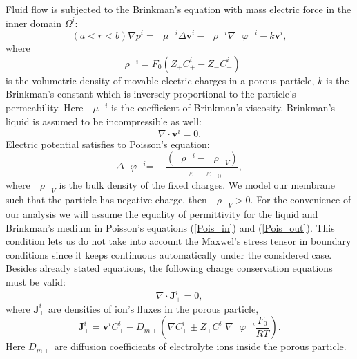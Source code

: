 \documentclass{amsart}
\begin{document}
Fluid flow is subjected to the Brinkman's equation with mass electric force in the inner domain  $\Omega^i:$
\begin{equation}\label{Brinkman}\left( a<r<b \right)
\nabla {{p}^{i}}={{\text{ }\!\!\mu\!\!\text{ }}^{i}}\Delta {{\mathbf{v}}^{i}}-{{\text{ }\!\!\rho\!\!\text{ }}^{i}}\nabla {{\text{ }\!\!\varphi\!\!\text{ }}^{i}}-k{{\mathbf{v}}^{i}},	
\end{equation}																						
where
\begin{equation}\label{rho}
{{\text{ }\!\!\rho\!\!\text{ }}^{i}}={{F}_{0}}\left( {{Z}_{+}}C_{+}^{i}-{{Z}_{-}}C_{-}^{i} \right)	
\end{equation}																								
is the volumetric  density of movable electric charges in a porous particle, $k$ is the Brinkman's constant which is inversely proportional to the particle's permeability. Here ${{\text{ }\!\!\mu\!\!\text{ }}^{i}}$ is the coefficient of  Brinkman's viscosity.  Brinkman's liquid is assumed to be incompressible as well:
\begin{equation}\label{divvi}
\nabla \cdot {{\mathbf{v}}^{i}}=0.
\end{equation}																														
Electric potential satisfies to Poisson's equation:
\begin{equation}\label{Pois_in}
\Delta {{\text{ }\!\!\varphi\!\!\text{ }}^{i}}\text{=}-\frac{\left( {{\text{ }\!\!\rho\!\!\text{ }}^{i}}-{{\text{ }\!\!\rho\!\!\text{ }}_{V}} \right)}{\text{ }\!\!\varepsilon\!\!\text{ }{{\text{ }\!\!\varepsilon\!\!\text{ }}_{0}}},						
\end{equation}																				
where ${{\text{ }\!\!\rho\!\!\text{ }}_{V}}$ is the bulk density of the fixed charges. We model our membrane such that the particle has negative charge, then ${{\text{ }\!\!\rho\!\!\text{ }}_{V}}>0$. For the convenience of our analysis we will assume the equality of permittivity for the liquid and Brinkman's medium in Poisson's equations (\ref{Pois_in}) and (\ref{Pois_out}).  This condition lets us do not take into account the Maxwel's stress tensor in boundary conditions since it keeps continuous automatically under the considered case. Besides already stated equations, the following  charge conservation equations must be valid:
\begin{equation}\label{Ji}
\nabla \cdot \mathbf{J}_{\pm }^{i}=0,
\end{equation}																														
where $\mathbf{J}_{\pm }^{i}$ are  densities of ion's fluxes in the porous particle,
$$\mathbf{J}_{\pm }^{i}={{\mathbf{v}}^{i}}C_{\pm }^{i}-{{D}_{m\pm }}\left( \nabla C_{\pm }^{i}\pm {{Z}_{\pm }}C_{\pm }^{i}\nabla {{\text{ }\!\!\varphi\!\!\text{ }}^{i}}\frac{{{F}_{0}}}{RT} \right).$$																	
Here ${{D}_{m\pm }}$ are diffusion coefficients of electrolyte ions inside the porous particle.
\end{document}
